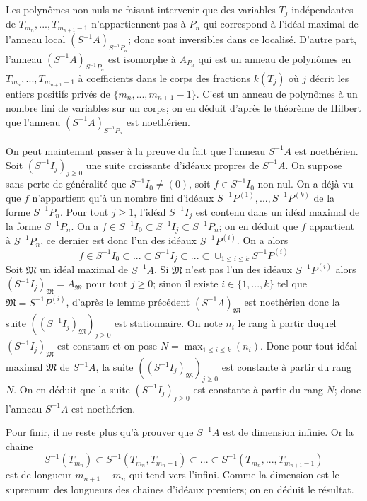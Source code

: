 \documentclass{article}
\begin{document}
Les polynômes non nuls ne faisant intervenir que des variables $T_j$ indépendantes de $T_{m_n}, ..., T_{m_{n+1}-1}$ n'appartiennent pas à $P_n$ qui correspond à l'idéal maximal de l'anneau local $(S^{-1}A)_{S^{-1}P_n}$; donc sont inversibles dans ce localisé. D'autre part, l'anneau $(S^{-1}A)_{S^{-1}P_n}$ est isomorphe à $A_{P_n}$ qui est un anneau de polynômes en $T_{m_n}, ..., T_{m_{n+1}-1}$ à coefficients dans le corps des fractions $k(T_j)$ où $j$ décrit les entiers positifs privés de $\{m_n, ..., m_{n+1}-1\}$. C'est un anneau de polynômes à un nombre fini de variables sur un corps; on en déduit d'après le théorème de Hilbert que l'anneau $(S^{-1}A)_{S^{-1}P_n}$ est noethérien.

On peut maintenant passer à la preuve du fait que l'anneau $S^{-1}A$ est noethérien. Soit $(S^{-1}I_j)_{j \geq 0}$ une suite croissante d'idéaux propres de $S^{-1}A$. On suppose sans perte de généralité que $S^{-1}I_0 \neq (0)$, soit $f \in S^{-1}I_0$ non nul. On a déjà vu que $f$ n'appartient qu'à un nombre fini d'idéaux $S^{-1}P^{(1)}, ..., S^{-1}P^{(k)}$ de la forme $S^{-1}P_n$. Pour tout $j \geq 1$, l'idéal $S^{-1}I_j$ est contenu dans un idéal maximal de la forme $S^{-1}P_n$. On a $f \in S^{-1}I_0 \subset S^{-1}I_j \subset S^{-1}P_n$; on en déduit que $f$ appartient à $S^{-1}P_n$, ce dernier est donc l'un des idéaux $S^{-1}P^{(i)}$.
On a alors
\begin{equation*}
f \in S^{-1}I_0 \subset ... \subset S^{-1}I_j \subset ... \subset \cup_{1 \leq i \leq k}S^{-1}P^{(i)}
\end{equation*}
Soit $\mathfrak{M}$ un idéal maximal de $S^{-1}A$. Si $\mathfrak{M}$ n'est pas l'un des idéaux $S^{-1}P^{(i)}$ alors $(S^{-1}I_j)_\mathfrak{M} = A_\mathfrak{M}$ pour tout $j \geq 0$; sinon il existe $i \in \{1, ..., k\}$ tel que $\mathfrak{M} = S^{-1}P^{(i)}$, d'après le lemme précédent $(S^{-1}A)_\mathfrak{M}$ est noethérien donc la suite $( (S^{-1}I_j)_\mathfrak{M} )_{j \geq 0}$ est stationnaire. On note $n_i$ le rang à partir duquel $(S^{-1}I_j)_\mathfrak{M}$ est constant et on pose $N = \max_{1 \leq i \leq k}(n_i)$. Donc pour tout idéal maximal $\mathfrak{M}$ de $S^{-1}A$, la suite $( (S^{-1}I_j)_\mathfrak{M} )_{j \geq 0}$ est constante à partir du rang $N$. On en déduit que la suite $(S^{-1}I_j)_{j \geq 0}$ est constante à partir du rang $N$; donc l'anneau $S^{-1}A$ est noethérien.

Pour finir, il ne reste plus qu'à prouver que $S^{-1}A$ est de dimension infinie. Or la chaine
\begin{equation*}
S^{-1}(T_{m_n}) \subset S^{-1}(T_{m_n}, T_{m_n+1}) \subset ... \subset S^{-1}(T_{m_n}, ..., T_{m_{n+1}-1})
\end{equation*}
est de longueur $m_{n+1} - m_n$ qui tend vers l'infini. Comme la dimension est le supremum des longueurs des chaines d'idéaux premiers; on en déduit le résultat.



\end{document}
